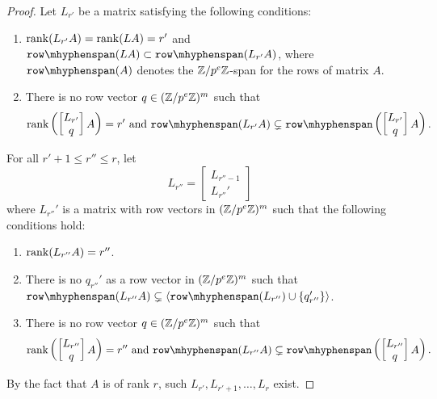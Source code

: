 \begin{proof}
Let $L_{r'}$ be a matrix satisfying the following conditions:
\begin{enumerate}
\item $\rank(L_{r'} A) =\rank(L A) = r'$ and   $\rowspan(L A) \subset \rowspan(L_{r'} A)$, where $\rowspan(A)$ denotes the $\mathbb{Z} / p^e \mathbb{Z}$-span for the rows of matrix $A$.
\item There is no row vector $q \in (\mathbb{Z} / p^e \mathbb{Z})^m$  such that 
\[\rank\left(\begin{bmatrix} L_{r'} \\ q \end{bmatrix} A\right) = r' \text{ and } 
\rowspan(L_{r'} A) \subsetneq \rowspan\left(\begin{bmatrix} L_{r'} \\ q \end{bmatrix} A\right).\]
\end{enumerate}
For all $r' + 1 \leq r'' \leq r$, let
\[L_{r''}  = \begin{bmatrix}L_{r'' - 1} \\ L_{r''}' \end{bmatrix}\]
where $L_{r''}'$ is a matrix with row vectors in $(\mathbb{Z} / p^e \mathbb{Z})^m$ 
such that the following conditions hold: 
\begin{enumerate}
\item $\rank(L_{r''} A) = r''$. 
\item There is no $q_{r''}'$ as a row vector in $(\mathbb{Z} / p^e \mathbb{Z})^m$  such that 
$\rowspan(L_{r''} A) \subsetneq \langle \rowspan(L_{r''}) \cup \{q_{r''}'\} \rangle$.
\item There is no row vector $q \in (\mathbb{Z} / p^e \mathbb{Z})^m$  such that 
\[\rank\left(\begin{bmatrix} L_{r''} \\ q \end{bmatrix} A\right) = r'' \text{ and } 
\rowspan(L_{r''} A) \subsetneq \rowspan\left(\begin{bmatrix} L_{r''} \\ q \end{bmatrix} A\right).\]

\end{enumerate}
By the fact that  $A$ is of rank $r$, such $L_{r'}, L_{r' + 1}, \dots, L_{r}$ exist. 


\end{proof}
